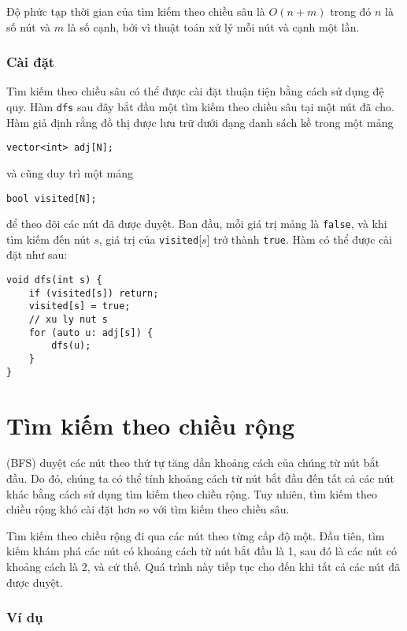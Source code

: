 Độ phức tạp thời gian của tìm kiếm theo chiều sâu là $O(n+m)$
trong đó $n$ là số nút và $m$ là
số cạnh,
bởi vì thuật toán xử lý mỗi nút và cạnh một lần.

\subsubsection*{Cài đặt}

Tìm kiếm theo chiều sâu có thể được cài đặt
thuận tiện bằng cách sử dụng đệ quy.
Hàm \texttt{dfs} sau đây bắt đầu
một tìm kiếm theo chiều sâu tại một nút đã cho.
Hàm giả định rằng đồ thị được
lưu trữ dưới dạng danh sách kề trong một mảng
\begin{lstlisting}
vector<int> adj[N];
\end{lstlisting}
và cũng duy trì một mảng
\begin{lstlisting}
bool visited[N];
\end{lstlisting}
để theo dõi các nút đã được duyệt.
Ban đầu, mỗi giá trị mảng là \texttt{false},
và khi tìm kiếm đến nút $s$,
giá trị của \texttt{visited}[$s$] trở thành \texttt{true}.
Hàm có thể được cài đặt như sau:
\begin{lstlisting}
void dfs(int s) {
    if (visited[s]) return;
    visited[s] = true;
    // xu ly nut s
    for (auto u: adj[s]) {
        dfs(u);
    }
}
\end{lstlisting}

\section{Tìm kiếm theo chiều rộng}


 (BFS) duyệt các nút
theo thứ tự tăng dần khoảng cách của chúng
từ nút bắt đầu.
Do đó, chúng ta có thể tính khoảng cách
từ nút bắt đầu đến tất cả các nút khác
bằng cách sử dụng tìm kiếm theo chiều rộng.
Tuy nhiên, tìm kiếm theo chiều rộng khó cài đặt hơn
so với tìm kiếm theo chiều sâu.

Tìm kiếm theo chiều rộng đi qua các nút
theo từng cấp độ một.
Đầu tiên, tìm kiếm khám phá các nút có
khoảng cách từ nút bắt đầu là 1,
sau đó là các nút có khoảng cách là 2, và cứ thế.
Quá trình này tiếp tục cho đến khi tất cả các nút
đã được duyệt.

\subsubsection*{Ví dụ}

